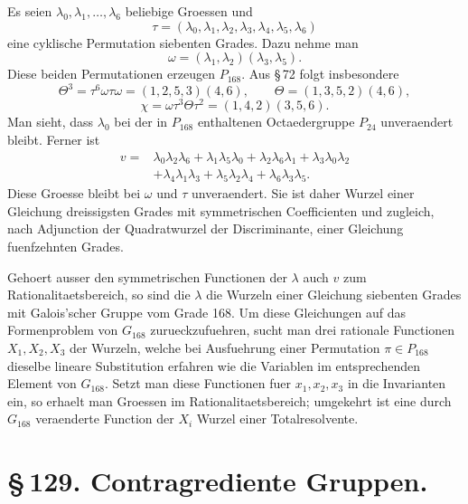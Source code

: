 \documentclass[11pt]{article}
\begin{document}
Es seien \(\lambda_0,\lambda_1,\ldots,\lambda_6\) beliebige Groessen und
\begin{equation}
\tau=(\lambda_0,\lambda_1,\lambda_2,\lambda_3,\lambda_4,\lambda_5,\lambda_6)
\tag{1}
\end{equation}
eine cyklische Permutation siebenten Grades. Dazu nehme man
\begin{equation}
\omega=(\lambda_1,\lambda_2)(\lambda_3,\lambda_5).
\tag{2}
\end{equation}
Diese beiden Permutationen erzeugen \(P_{168}\). Aus \S\,72 folgt insbesondere
\begin{equation}
\Theta^3=\tau^6\omega\tau\omega=(1,2,5,3)(4,6),\qquad
\Theta=(1,3,5,2)(4,6),
\end{equation}
\begin{equation}
\chi=\omega\tau^3\Theta\tau^2=(1,4,2)(3,5,6).
\end{equation}
Man sieht, dass \(\lambda_0\) bei der in \(P_{168}\) enthaltenen Octaedergruppe \(P_{24}\) unveraendert bleibt. Ferner ist
\begin{equation}
\begin{aligned}
v={}&\lambda_0\lambda_2\lambda_6+
\lambda_1\lambda_5\lambda_0+
\lambda_2\lambda_6\lambda_1+
\lambda_3\lambda_0\lambda_2\\
&+\lambda_4\lambda_1\lambda_3+
\lambda_5\lambda_2\lambda_4+
\lambda_6\lambda_3\lambda_5.
\end{aligned}
\tag{3}
\end{equation}
Diese Groesse bleibt bei \(\omega\) und \(\tau\) unveraendert. Sie ist daher Wurzel einer Gleichung dreissigsten Grades mit symmetrischen Coefficienten und zugleich, nach Adjunction der Quadratwurzel der Discriminante, einer Gleichung fuenfzehnten Grades.

Gehoert ausser den symmetrischen Functionen der \(\lambda\) auch \(v\) zum Rationalitaetsbereich, so sind die \(\lambda\) die Wurzeln einer Gleichung siebenten Grades mit Galois'scher Gruppe vom Grade 168. Um diese Gleichungen auf das Formenproblem von \(G_{168}\) zurueckzufuehren, sucht man drei rationale Functionen \(X_1,X_2,X_3\) der Wurzeln, welche bei Ausfuehrung einer Permutation \(\pi\in P_{168}\) dieselbe lineare Substitution erfahren wie die Variablen im entsprechenden Element von \(G_{168}\). Setzt man diese Functionen fuer \(x_1,x_2,x_3\) in die Invarianten ein, so erhaelt man Groessen im Rationalitaetsbereich; umgekehrt ist eine durch \(G_{168}\) veraenderte Function der \(X_i\) Wurzel einer Totalresolvente.

\section*{\S\,129. Contragrediente Gruppen.}
\end{document}
